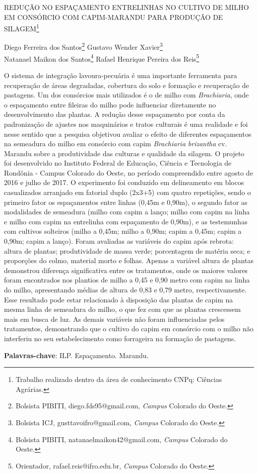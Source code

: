\documentclass[article,12pt,onesidea,4paper,english,brazil]{abntex2}
\begin{document}
	
	
	\frenchspacing 
	
	\begin{center}
		\LARGE REDUÇÃO NO ESPAÇAMENTO ENTRELINHAS NO CULTIVO DE MILHO EM
		CONSÓRCIO COM CAPIM-MARANDU PARA PRODUÇÃO DE SILAGEM\footnote{Trabalho realizado dentro da área de conhecimento CNPq: Ciências Agrárias.}
		
		\normalsize
		Diego Ferreira dos Santos\footnote{Bolsista PIBITI, diego.fds95@gmail.com, \textit{Campus} Colorado do Oeste.} 
		Gustavo Wender Xavier\footnote{Bolsista ICJ, gusttavoifro@gmail.com, \textit{Campus} Colorado do Oeste.} \\
		Natanael Maikon dos Santos\footnote{Bolsista PIBITI, natanaelmaikon42@gmail.com, \textit{Campus} Colorado do Oeste.} 
		Rafael Henrique Pereira dos Reis\footnote{Orientador, rafael.reis@ifro.edu.br, \textit{Campus} Colorado do Oeste.} 
	\end{center}
	
	\noindent O sistema de integração lavoura-pecuária é uma importante ferramenta para
	recuperação de áreas degradadas, cobertura do solo e formação e recuperação de
	pastagens. Um dos consórcios mais utilizados é o de milho com \textit{Brachiaria}, onde o
	espaçamento entre fileiras do milho pode influenciar diretamente no
	desenvolvimento das plantas. A redução desse espaçamento por conta da
	padronização de ajustes nos maquinários e tratos culturais é uma realidade e foi
	nesse sentido que a pesquisa objetivou avaliar o efeito de diferentes espaçamentos
	na semeadura do milho em consórcio com capim \textit{Brachiaria brizantha} cv. Marandu
	sobre a produtividade das culturas e qualidade da silagem. O projeto foi
	desenvolvido no Instituto Federal de Educação, Ciência e Tecnologia de Rondônia -
	Campus Colorado do Oeste, no período compreendido entre agosto de 2016 e julho
	de 2017. O experimento foi conduzido em delineamento em blocos casualizados
	arranjado em fatorial duplo (2x3+5) com quatro repetições, sendo o primeiro fator os
	espaçamentos entre linhas (0,45m e 0,90m), o segundo fator as modalidades de
	semeadura (milho com capim a lanço; milho com capim na linha e milho com capim
	na entrelinha com espaçamento de 0,90m), e as testemunhas com cultivos solteiros
	(milho a 0,45m; milho a 0,90m; capim a 0,45m; capim a 0,90m; capim a lanço).
	Foram avaliadas as variáveis do capim após rebrota: altura de plantas; produtividade
	de massa verde; porcentagem de matéria seca; e proporções do colmo, material
	morto e folhas. Apenas a variável altura de plantas demonstrou diferença
	significativa entre os tratamentos, onde os maiores valores foram encontrados nos
	plantios de milho a 0,45 e 0,90 metro com capim na linha do milho, apresentando
	médias de altura de 0,83 e 0,79 metro, respectivamente. Esse resultado pode estar
	relacionado à disposição das plantas de capim na mesma linha de semeadura do
	milho, o que fez com que as plantas crescessem mais em busca de luz. As demais
	variáveis não foram influenciadas pelos tratamentos, demonstrando que o cultivo do
	capim em consórcio com o milho não interferiu no seu estabelecimento como
	forrageira na formação de pastagens.
	
	\vspace{\onelineskip}
	
	\noindent
	\textbf{Palavras-chave}: ILP. Espaçamento. Marandu.	
	
\end{document}
